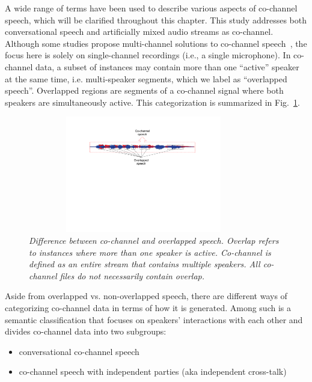 A wide range of terms have been used to describe various aspects of co-channel speech, 
which will be clarified throughout this chapter. 
This study addresses both conversational speech and artificially mixed audio streams as co-channel. 
Although some studies propose multi-channel solutions to co-channel speech~\cite{panahi2009blind,xiao2011overlapped}, the focus here is solely on single-channel recordings (i.e., a single microphone). 
In co-channel data, a subset of instances may contain more than one ``active'' speaker at the same time, i.e. multi-speaker segments, 
which we label as ``overlapped speech''. 
Overlapped regions are segments of a co-channel signal where both speakers are simultaneously active. This categorization is summarized in Fig.~\ref{fig:cochannel_vs_overlap}.


\begin{figure}[h!]
	\centering
	\vspace{0mm}
	\includegraphics[height = 2in, width=0.9\textwidth]{figures/cochannel_vs_overlap-crop}
	\vspace{-3mm}
	\caption{\it \small Difference between co-channel and overlapped speech. Overlap refers to instances where more than one speaker is active. Co-channel is defined as an entire stream that contains multiple speakers. All co-channel files do not necessarily contain overlap. }
	\label{fig:cochannel_vs_overlap}
	\vspace{-3mm}
\end{figure}



Aside from overlapped vs. non-overlapped speech, there are different ways of categorizing co-channel data in terms of how it is generated. 
Among such is a semantic classification that focuses on speakers' interactions with each other and divides co-channel data into two subgroups: 
\begin{itemize}
	\item conversational co-channel speech
	\item co-channel speech with independent parties (aka independent cross-talk)
\end{itemize} 


